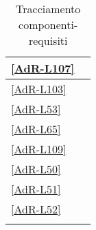 \begin{longtable}{|P{6cm}|P{6cm}|}
	\hline \ref{AdR-L107} &  \\
	\hline \ref{AdR-L103} &  \\
	\hline \ref{AdR-L53} &  \\
	\hline \ref{AdR-L65} &  \\ %
	\hline \ref{AdR-L109} &  \\
	\hline \ref{AdR-L50} &  \\
	\hline \ref{AdR-L51} &  \\
	\hline \ref{AdR-L52} &  \\ %
	
	\hline
	\caption{Tracciamento componenti-requisiti}
\end{longtable}

